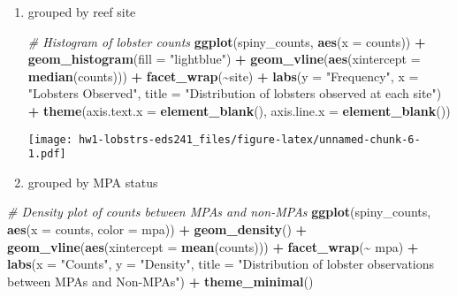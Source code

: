\documentclass[
]{article}
\newenvironment{Shaded}{\begin{snugshade}}{\end{snugshade}}
\newcommand{\AttributeTok}[1]{\textcolor[rgb]{0.13,0.29,0.53}{#1}}
\newcommand{\CommentTok}[1]{\textcolor[rgb]{0.56,0.35,0.01}{\textit{#1}}}
\newcommand{\FunctionTok}[1]{\textcolor[rgb]{0.13,0.29,0.53}{\textbf{#1}}}
\newcommand{\NormalTok}[1]{#1}
\newcommand{\SpecialCharTok}[1]{\textcolor[rgb]{0.81,0.36,0.00}{\textbf{#1}}}
\newcommand{\StringTok}[1]{\textcolor[rgb]{0.31,0.60,0.02}{#1}}
\begin{document}
\begin{enumerate}
\def\labelenumi{\arabic{enumi})}
\item
  grouped by reef site

\begin{Shaded}
\begin{Highlighting}[]
\CommentTok{\# Histogram of lobster counts }
\FunctionTok{ggplot}\NormalTok{(spiny\_counts, }\FunctionTok{aes}\NormalTok{(}\AttributeTok{x =}\NormalTok{ counts)) }\SpecialCharTok{+}
    \FunctionTok{geom\_histogram}\NormalTok{(}\AttributeTok{fill =} \StringTok{"lightblue"}\NormalTok{) }\SpecialCharTok{+}
    \FunctionTok{geom\_vline}\NormalTok{(}\FunctionTok{aes}\NormalTok{(}\AttributeTok{xintercept =} \FunctionTok{median}\NormalTok{(counts))) }\SpecialCharTok{+}
    \FunctionTok{facet\_wrap}\NormalTok{(}\SpecialCharTok{\textasciitilde{}}\NormalTok{site) }\SpecialCharTok{+}
    \FunctionTok{labs}\NormalTok{(}\AttributeTok{y =} \StringTok{"Frequency"}\NormalTok{, }\AttributeTok{x =} \StringTok{"Lobsters Observed"}\NormalTok{,}
         \AttributeTok{title =} \StringTok{"Distribution of lobsters observed at each site"}\NormalTok{) }\SpecialCharTok{+}
    \FunctionTok{theme}\NormalTok{(}\AttributeTok{axis.text.x =} \FunctionTok{element\_blank}\NormalTok{(),}
          \AttributeTok{axis.line.x =} \FunctionTok{element\_blank}\NormalTok{())}
\end{Highlighting}
\end{Shaded}

  \texttt{[image: hw1-lobstrs-eds241\_files/figure-latex/unnamed-chunk-6-1.pdf]}

  \hfill\break
\item
  grouped by MPA status
\end{enumerate}

\begin{Shaded}
\begin{Highlighting}[]
\CommentTok{\# Density plot of counts between MPAs and non{-}MPAs}
\FunctionTok{ggplot}\NormalTok{(spiny\_counts, }\FunctionTok{aes}\NormalTok{(}\AttributeTok{x =}\NormalTok{ counts, }
                         \AttributeTok{color =}\NormalTok{ mpa)) }\SpecialCharTok{+}
    \FunctionTok{geom\_density}\NormalTok{() }\SpecialCharTok{+}
    \FunctionTok{geom\_vline}\NormalTok{(}\FunctionTok{aes}\NormalTok{(}\AttributeTok{xintercept =} \FunctionTok{mean}\NormalTok{(counts))) }\SpecialCharTok{+}
    \FunctionTok{facet\_wrap}\NormalTok{(}\SpecialCharTok{\textasciitilde{}}\NormalTok{ mpa) }\SpecialCharTok{+}
    \FunctionTok{labs}\NormalTok{(}\AttributeTok{x =} \StringTok{"Counts"}\NormalTok{, }\AttributeTok{y =} \StringTok{"Density"}\NormalTok{,}
         \AttributeTok{title =} \StringTok{"Distribution of lobster observations between MPAs and Non{-}MPAs"}\NormalTok{) }\SpecialCharTok{+}
    \FunctionTok{theme\_minimal}\NormalTok{()}
\end{Highlighting}
\end{Shaded}
\end{document}
